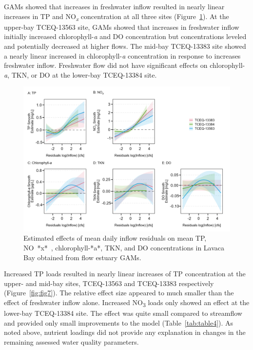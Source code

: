 \documentclass[sn-basic,referee,lineno,pdflatex]{sn-jnl}
\begin{document}
GAMs showed that increases in freshwater inflow resulted in nearly
linear increases in TP and NO\textsubscript{\emph{x}} concentration at
all three sites (Figure~\ref{fig:fig6}). At the upper-bay TCEQ-13563
site, GAMs showed that increases in freshwater inflow initially
increased chlorophyll-\emph{a} and DO concentration but concentrations
leveled and potentially decreased at higher flows. The mid-bay
TCEQ-13383 site showed a nearly linear increased in chlorophyll-\emph{a}
concentration in response to increases freshwater inflow. Freshwater
flow did not have significant effects on chlorophyll-\emph{a}, TKN, or
DO at the lower-bay TCEQ-13384 site.

\begin{figure}

{\centering \includegraphics[width=1\linewidth,]{Schramm-2023-05-AS_files/figure-latex/fig6-1} 

}

\caption{Estimated effects of mean daily inflow residuals on mean TP, NO~*x*~, chlorophyll-*a*, TKN, and DO concentrations in Lavaca Bay obtained from flow estuary GAMs.}\label{fig:fig6}
\end{figure}

Increased TP loads resulted in nearly linear increases of TP
concentration at the upper- and mid-bay sites, TCEQ-13563 and TCEQ-13383
respectively (Figure~\ref{fig:fig7}). The relative effect size appeared
to much smaller than the effect of freshwater inflow alone. Increased
NO\textsubscript{3} loads only showed an effect at the lower-bay
TCEQ-13384 site. The effect was quite small compared to streamflow and
provided only small improvements to the model (Table~\ref{tab:table4}).
As noted above, nutrient loadings did not provide any explanation in
changes in the remaining assessed water quality parameters.
\end{document}
